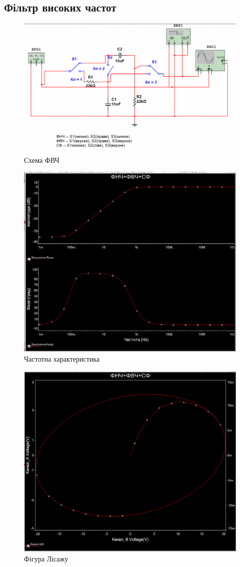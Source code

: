 \documentclass[
  ukrainian,
  14pt
]{extreport}
\begin{document}
\subsection{Фільтр високих частот}
\begin{figure}[H]
  \centering
  \includegraphics[width=.6\textwidth]{imgs/FVC-1.png}
  \caption{Схема ФВЧ}
\end{figure}
\begin{figure}[H]
  \centering
  \includegraphics[width=.6\textwidth]{imgs/FVC-2.png}
  \caption{Частотна характеристика}
\end{figure}
\begin{figure}[H]
  \centering
  \includegraphics[width=.6\textwidth]{imgs/FVC-3.png}
  \caption{Фігура Лісажу}
\end{figure}
\end{document}
